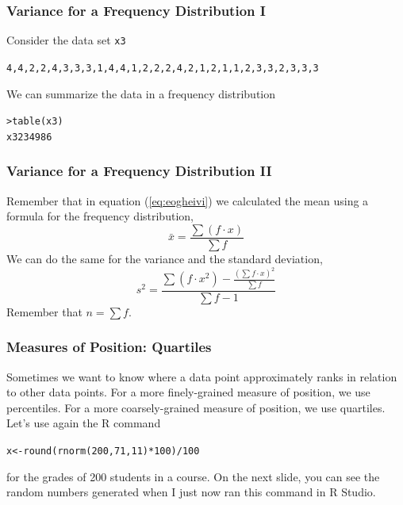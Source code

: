 \documentclass[xcolor=dvipsnames]{beamer}
\begin{document}
\begin{frame}
  \frametitle{Variance for a Frequency Distribution I}
Consider the data set \texttt{x3}
\begin{alltt}
4,4,2,2,4,3,3,3,1,4,4,1,2,2,2,4,2,1,2,1,1,2,3,3,2,3,3,3
\end{alltt}
We can summarize the data in a frequency distribution
\begin{alltt}
> table(x3)\newline
x3 2 3 4  9 8 6 
\end{alltt}
\end{frame}

\begin{frame}
  \frametitle{Variance for a Frequency Distribution II}
Remember that in equation (\ref{eq:eogheivi}) we calculated the mean using a
formula for the frequency distribution,
\begin{equation}
  \label{eq:beingeip}
  \bar{x}=\frac{\sum{}\left(f\cdot{}x\right)}{\sum{}f}
\end{equation}
We can do the same for the variance and the standard deviation,
\begin{equation}
  \label{eq:iefoopoo}
  s^{2}=\frac{\sum{}\left(f\cdot{}x^{2}\right)-\frac{\left(\sum{}f\cdot{}x\right)^{2}}{\sum{}f}}{\sum{}f-1}
\end{equation}
Remember that $n=\sum{}f$.
\end{frame}

\begin{frame}
  \frametitle{Measures of Position: Quartiles}
Sometimes we want to know where a data point approximately ranks in
relation to other data points. For a more finely-grained measure of
position, we use percentiles. For a more coarsely-grained measure of
position, we use quartiles. Let's use again the R command
\begin{alltt}
  x<-round(rnorm(200,71,11)*100)/100
\end{alltt}
for the grades of 200 students in a course. On the next slide, you can
see the random numbers generated when I just now ran this command in R Studio.
\end{frame}
\end{document}

